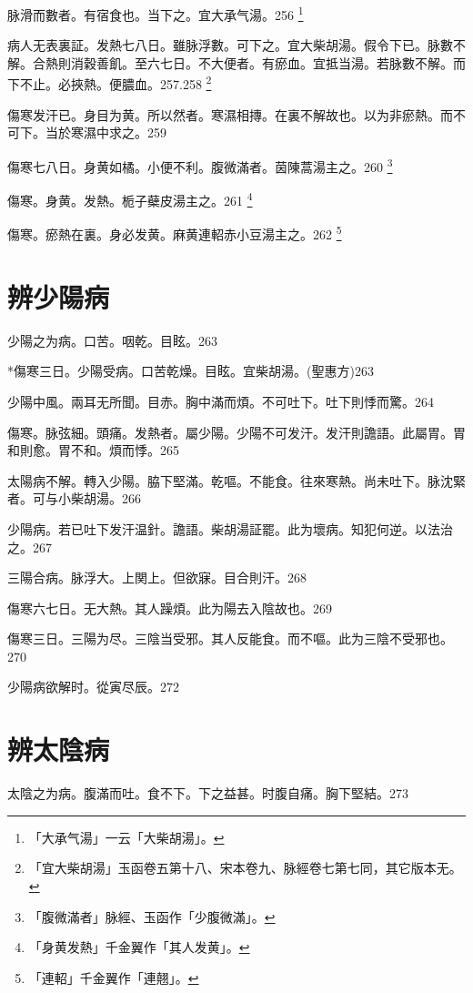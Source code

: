 脉滑而數者。有宿食也。当下之。宜{\khaaitp 大}承气湯。256
	\footnote{「大承气湯」一云「大柴胡湯」。}

病人无表裏証。发熱七八日。雖脉浮數。可下之。{\khaaitp 宜大柴胡湯。}假令下已。脉數不解。合熱則消穀善飢。至六七日。不大便者。有瘀血。宜抵当湯。若脉數不解。而下不止。必挾熱。便膿血。257.258
	\footnote{「宜大柴胡湯」玉函卷五第十八、宋本卷九、脉經卷七第七同，其它版本无。}

傷寒发汗已。身目为黄。所以然者。寒濕相摶。在裏不解故也。以为非瘀熱。而不可下。当於寒濕中求之。259

傷寒七八日。身黄如橘。小便不利。腹微滿者。茵陳{\khaaitp 蒿}湯主之。260
	\footnote{「腹微滿者」脉經、玉函作「少腹微滿」。}

傷寒。身黄。发熱。栀子蘗皮湯主之。261
	\footnote{「身黄发熱」千金翼作「其人发黄」。}

傷寒。瘀熱在裏。身必发黄。麻黄連軺赤小豆湯主之。262
	\footnote{「連軺」千金翼作「連翹」。}

\chapter{辨少陽病}

少陽之为病。口苦。咽乾。目眩。263

*傷寒三日。少陽受病。口苦乾燥。目眩。宜柴胡湯。(聖惠方)263

少陽中風。兩耳无所聞。目赤。胸中滿而煩。不可吐下。吐下則悸而驚。264

傷寒。脉弦細。頭痛。发熱者。屬少陽。少陽不可发汗。发汗則譫語。此屬胃。胃和則愈。胃不和。煩而悸。265

太陽病不解。轉入少陽。脇下堅滿。乾嘔。不能食。往來寒熱。尚未吐下。脉沈緊者。可与小柴胡湯。266

{\khaaitp 少陽病。}若已吐下发汗温針。{\khaaitp 譫語。}柴胡湯証罷。此为壞病。知犯何逆。以法治之。267

三陽合病。脉浮大。上関上。但欲寐。目合則汗。268

傷寒六七日。无大熱。其人躁煩。此为陽去入陰故也。269

傷寒三日。三陽为尽。三陰当受邪。其人反能食。而不嘔。此为三陰不受邪也。270

少陽病欲解时。從寅尽辰。272

\chapter{辨太陰病}

太陰之为病。腹滿而吐。食不下。下之益甚。时腹自痛。胸下堅結。273

